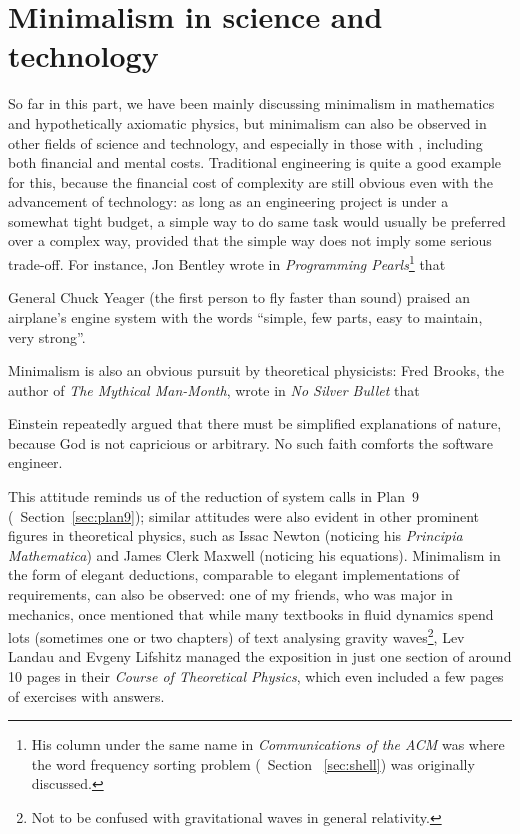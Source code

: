 \section{Minimalism in science and technology}\label{sec:science}

So far in this part, we have been mainly discussing minimalism in mathematics
and hypothetically axiomatic physics, but minimalism can also be observed
in other fields of science and technology, and especially in those with
, including both
financial and mental costs.  Traditional engineering is quite a good example
for this, because the financial cost of complexity are still obvious even
with the advancement of technology: as long as an engineering project is
under a somewhat tight budget, a simple way to do same task would usually
be preferred over a complex way, provided that the simple way does not imply
some serious trade-off.  For instance, Jon Bentley wrote in \emph{Programming
Pearls}\footnote{His column under the same name in \emph{Communications
of the ACM} was where the word frequency sorting problem (\cf~Section~%
\ref{sec:shell}) was originally discussed.} that
\begin{quoting}
	General Chuck Yeager (the first person to fly faster than
	sound) praised an airplane's engine system with the words
	``simple, few parts, easy to maintain, very strong''.
\end{quoting}

Minimalism is also an obvious pursuit by theoretical physicists:
Fred Brooks, the author of \emph{The Mythical Man-Month},
wrote in \emph{No Silver Bullet} that
\begin{quoting}
	Einstein repeatedly argued that there must be simplified
	explanations of nature, because God is not capricious or
	arbitrary.  No such faith comforts the software engineer.
\end{quoting}
This attitude reminds us of the reduction of system calls in Plan~9
(\cf~Section~\ref{sec:plan9}); similar attitudes were also evident
in other prominent figures in theoretical physics, such as Issac Newton
(noticing his \emph{Principia Mathematica}) and James Clerk Maxwell
(noticing his equations).  Minimalism in the form of elegant deductions,
comparable to elegant implementations of requirements, can also be observed:
one of my friends, who was major in mechanics, once mentioned that while many
textbooks in fluid dynamics spend lots (sometimes one or two chapters) of
text analysing gravity waves\footnote{Not to be confused with gravitational
waves in general relativity.}, Lev Landau and Evgeny Lifshitz managed the
exposition in just one section of around 10 pages in their \emph{Course of
Theoretical Physics}, which even included a few pages of exercises with answers.

